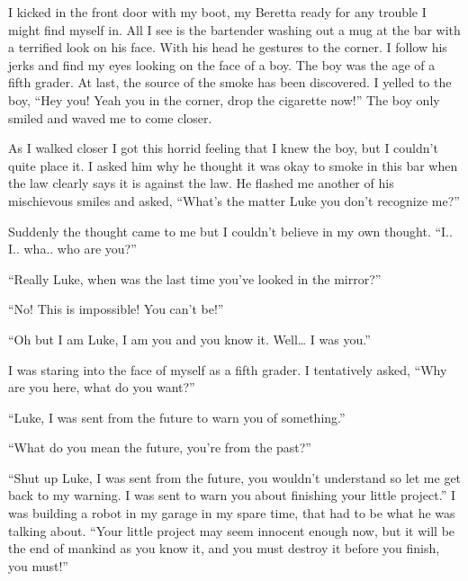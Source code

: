 I kicked in the front door with my boot, my Beretta ready for any
trouble I might find myself in. All I see is the bartender washing
out a mug at the bar with a terrified look on his face. With his
head he gestures to the corner. I follow his jerks and find my eyes
looking on the face of a boy. The boy was the age of a fifth
grader. At last, the source of the smoke has been discovered. I
yelled to the boy, ``Hey you! Yeah you in the corner, drop the
cigarette now!'' The boy only smiled and waved me to come
closer.



As I walked closer I got this horrid feeling that I knew the boy,
but I couldn't quite place it. I asked him why he thought it
was okay to smoke in this bar when the law clearly says it is
against the law. He flashed me another of his mischievous smiles
and asked, ``What's the matter Luke you don't
recognize me?''



Suddenly the thought came to me but I couldn't believe in my
own thought. ``I.. I.. wha.. who are you?''



``Really Luke, when was the last time you've looked in
the mirror?''



``No! This is impossible! You can't be!''



``Oh but I am Luke, I am you and you know it. Well{\ldots} I
was you.''



I was staring into the face of myself as a fifth grader. I
tentatively asked, ``Why are you here, what do you
want?''



``Luke, I was sent from the future to warn you of
something.''



``What do you mean the future, you're from the
past?''



``Shut up Luke, I was sent from the future, you wouldn't
understand so let me get back to my warning. I was sent to warn you
about finishing your little project.'' I was building a robot
in my garage in my spare time, that had to be what he was talking
about. ``Your little project may seem innocent enough now, but
it will be the end of mankind as you know it, and you must destroy
it before you finish, you must!''



